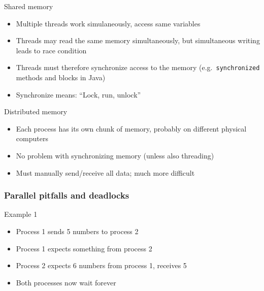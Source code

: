 \documentclass[usenames,dvipsnames,mathserif,compress]{beamer}
\begin{document}
\begin{frame}
  \begin{block}{Shared memory}
    \begin{itemize}
    \item Multiple threads work simulaneously, access same variables
    \item Threads may read the same memory simultaneously, but
      simultaneous writing leads to \alert{race condition}
    \item Threads must therefore \alert{synchronize} access to the memory
      (e.g.~\texttt{synchronized} methods and blocks in Java)
    \item Synchronize means: ``Lock, run, unlock''
    \end{itemize}
  \end{block}
  \begin{block}{Distributed memory}
    \begin{itemize}
    \item Each process has its own chunk of memory, probably on different physical computers
    \item No problem with synchronizing memory (unless also threading)
    \item Must manually send/receive all data; much more difficult
    \end{itemize}
  \end{block}
\end{frame}

\begin{frame}
  \frametitle{Parallel pitfalls and deadlocks}
  \begin{block}{Example 1}
    \begin{itemize}
    \item Process 1 sends 5 numbers to process 2
    \item Process 1 expects something from process 2
    \item Process 2 expects 6 numbers from process 1, receives 5
    \item Both processes now wait forever
    \end{itemize}
  \end{block}
\end{frame}
\end{document}
